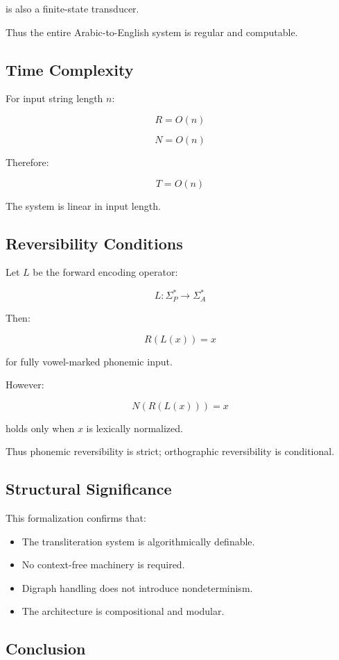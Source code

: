 \documentclass[12pt]{article}
\begin{document}
is also a finite-state transducer.

Thus the entire Arabic-to-English system is regular and computable.

\subsection{Time Complexity}

For input string length $n$:

\[
R = O(n)
\]

\[
N = O(n)
\]

Therefore:

\[
T = O(n)
\]

The system is linear in input length.

\subsection{Reversibility Conditions}

Let $L$ be the forward encoding operator:

\[
L : \Sigma_P^\ast \rightarrow \Sigma_A^\ast
\]

Then:

\[
R(L(x)) = x
\]

for fully vowel-marked phonemic input.

However:

\[
N(R(L(x))) = x
\]

holds only when $x$ is lexically normalized.

Thus phonemic reversibility is strict; orthographic reversibility is conditional.

\subsection{Structural Significance}

This formalization confirms that:

\begin{itemize}
\item The transliteration system is algorithmically definable.
\item No context-free machinery is required.
\item Digraph handling does not introduce nondeterminism.
\item The architecture is compositional and modular.
\end{itemize}

\subsection{Conclusion}
\end{document}
